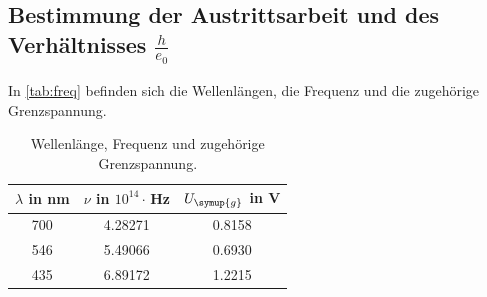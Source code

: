 \subsection{Bestimmung der Austrittsarbeit und des Verhältnisses $\frac{h}{e_0}$}
\label{sec:Auswertungb}

In \autoref{tab:freq} befinden sich die Wellenlängen, die Frequenz und die zugehörige Grenzspannung. 
\begin{table}
    \centering 
    \caption{Wellenlänge, Frequenz und zugehörige Grenzspannung.}
\begin{tabular}{c c c}
    \toprule
    $\lambda$ in nm &$\nu$ in $10^{14}\cdot$\,Hz & $U_{\symup{g}}$ in V  \\
    \midrule
    700 & 4.28271 & 0.8158\\ 
546 & 5.49066 & 0.6930\\
435 & 6.89172 & 1.2215\\
    \bottomrule
\end{tabular}
\label{tab:freq}
\end{table}

